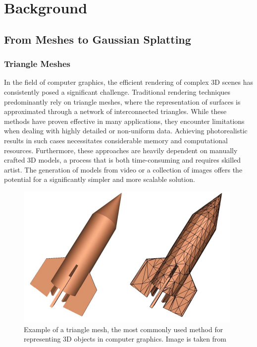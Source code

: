 \documentclass[12pt]{article}
\begin{document}
\begin{titlepage}
\centering
\tableofcontents
\end{titlepage}
\section{Background}
\subsection{From Meshes to Gaussian Splatting}
\subsubsection{Triangle Meshes}
In the field of computer graphics, the efficient rendering of complex 3D scenes has consistently posed a significant challenge. Traditional rendering techniques predominantly rely on triangle meshes, where the representation of surfaces is approximated through a network of interconnected triangles. While these methods have proven effective in many applications, they encounter limitations when dealing with highly detailed or non-uniform data. Achieving photorealistic results in such cases necessitates considerable memory and computational resources. Furthermore, these approaches are heavily dependent on manually crafted 3D models, a process that is both time-consuming and requires skilled artist. The generation of models from video or a collection of images offers the potential for a significantly simpler and more scalable solution.
\begin{figure}[h!]
	\centering
	\includegraphics[width=\textwidth]{Images/TriangleMesh.png}
	\caption{Example of a triangle mesh, the most commonly used method for representing 3D objects in computer graphics. Image is taken from \cite{Mesh}}
	\label{fig:trianglemesh}
\end{figure}
\newpage
\end{document}
